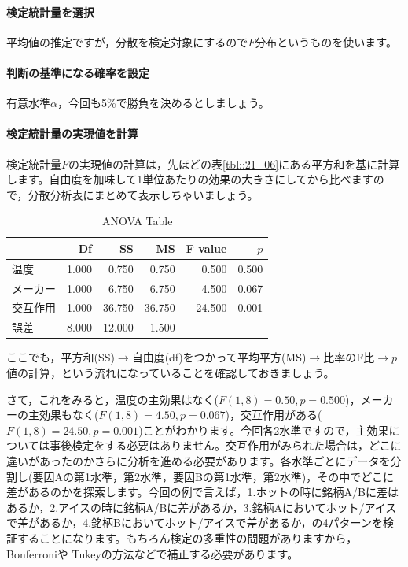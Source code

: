 \documentclass{ltjbook}
\begin{document}
\paragraph{検定統計量を選択}平均値の推定ですが，分散を検定対象にするので$F$分布というものを使います。
\paragraph{判断の基準になる確率を設定}有意水準$\alpha$，今回も5\%で勝負を決めるとしましょう。
\paragraph{検定統計量の実現値を計算}検定統計量$F$の実現値の計算は，先ほどの表\ref{tbl::21_06}にある平方和を基に計算します。自由度を加味して1単位あたりの効果の大きさにしてから比べますので，分散分析表にまとめて表示しちゃいましょう。
\begin{table}[ht]
  \centering
  \caption{ANOVA Table} 
  \begin{tabular}{lrrrrr}
    \hline
   & Df & SS & MS & F value & $p$ \\ 
    \hline
  温度          & 1.000 & 0.750 & 0.750 & 0.500 & 0.500 \\ 
    メーカー      & 1.000 & 6.750 & 6.750 & 4.500 & 0.067 \\ 
交互作用 & 1.000 & 36.750 & 36.750 & 24.500 & 0.001 \\ 
    誤差     & 8.000 & 12.000 & 1.500 &  &  \\ 
     \hline
  \end{tabular}
    \label{tbl::22_04}
  \end{table}

ここでも，平方和(SS)$\to$自由度(df)をつかって平均平方(MS)$\to$比率のF比$\to$$p$値の計算，という流れになっていることを確認しておきましょう。

さて，これをみると，温度の主効果はなく($F(1,8)=0.50,p=0.500$)，メーカーの主効果もなく($F(1,8)=4.50,p=0.067$)，交互作用がある($F(1,8)=24.50,p=0.001$)ことがわかります。今回各2水準ですので，主効果については事後検定をする必要はありません。交互作用がみられた場合は，どこに違いがあったのかさらに分析を進める必要があります。各水準ごとにデータを分割し(要因Aの第1水準，第2水準，要因Bの第1水準，第2水準)，その中でどこに差があるのかを探索します。今回の例で言えば，1.ホットの時に銘柄A/Bに差はあるか，2.アイスの時に銘柄A/Bに差があるか，3.銘柄Aにおいてホット/アイスで差があるか，4.銘柄Bにおいてホット/アイスで差があるか，の4パターンを検証することになります。もちろん検定の多重性の問題がありますから，Bonferroniや Tukeyの方法などで補正する必要があります。
\end{document}
